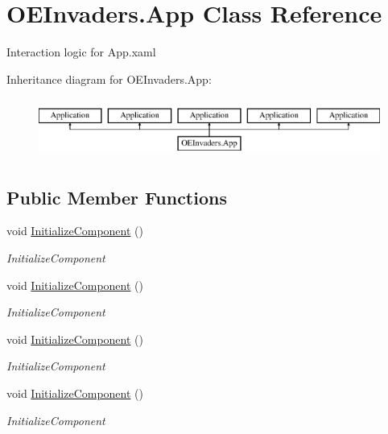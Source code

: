 \hypertarget{class_o_e_invaders_1_1_app}{}\section{O\+E\+Invaders.\+App Class Reference}
\label{class_o_e_invaders_1_1_app}


Interaction logic for App.\+xaml  


Inheritance diagram for O\+E\+Invaders.\+App\+:\begin{figure}[H]
\begin{center}
\leavevmode
\includegraphics[height=1.964912cm]{class_o_e_invaders_1_1_app}
\end{center}
\end{figure}
\subsection*{Public Member Functions}
\begin{DoxyCompactItemize}
\item 
void \mbox{\hyperlink{class_o_e_invaders_1_1_app_abca070a66419a1a060848b03639635b3}{Initialize\+Component}} ()
\begin{DoxyCompactList}\small\item\em Initialize\+Component \end{DoxyCompactList}\item 
void \mbox{\hyperlink{class_o_e_invaders_1_1_app_abca070a66419a1a060848b03639635b3}{Initialize\+Component}} ()
\begin{DoxyCompactList}\small\item\em Initialize\+Component \end{DoxyCompactList}\item 
void \mbox{\hyperlink{class_o_e_invaders_1_1_app_abca070a66419a1a060848b03639635b3}{Initialize\+Component}} ()
\begin{DoxyCompactList}\small\item\em Initialize\+Component \end{DoxyCompactList}\item 
void \mbox{\hyperlink{class_o_e_invaders_1_1_app_abca070a66419a1a060848b03639635b3}{Initialize\+Component}} ()
\begin{DoxyCompactList}\small\item\em Initialize\+Component \end{DoxyCompactList}\end{DoxyCompactItemize}
